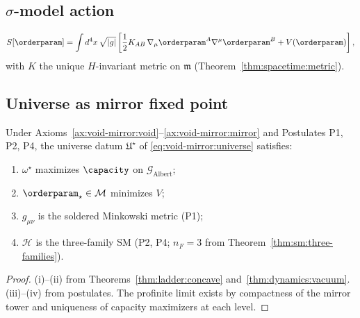 \subsection{$\sigma$-model action}
\label{sec:dynamics:action}

\begin{equation}\label{eq:dynamics:action}
  S[\orderparam]=\int d^4x\,\sqrt{|g|}\left[
    \frac{1}{2}K_{AB}\,\nabla_\mu\orderparam^A\nabla^\mu\orderparam^B
    +V(\orderparam)\right],
\end{equation}
with $K$ the unique $H$-invariant metric on $\mathfrak{m}$
(Theorem~\ref{thm:spacetime:metric}).

\subsection{Universe as mirror fixed point}
\label{sec:dynamics:universe}

\begin{theorem}\label{thm:dynamics:universe}
Under Axioms~\ref{ax:void-mirror:void}--\ref{ax:void-mirror:mirror} and
Postulates P1, P2, P4, the universe datum $\mathfrak{U}^\star$ of
\eqref{eq:void-mirror:universe} satisfies:
\begin{enumerate}[label=(\roman*)]
  \item $\omega^\star$ maximizes $\capacity$ on $\mathcal{G}_{\mathrm{Albert}}$;
  \item $\orderparam_\star\in\mathcal{M}$ minimizes $V$;
  \item $g_{\mu\nu}$ is the soldered Minkowski metric (P1);
  \item $\mathcal{H}$ is the three-family SM (P2, P4;
    $n_F=3$ from Theorem~\ref{thm:sm:three-families}).
\end{enumerate}
\end{theorem}

\begin{proof}
(i)--(ii) from Theorems~\ref{thm:ladder:concave} and~\ref{thm:dynamics:vacuum}.
(iii)--(iv) from postulates. The profinite limit exists by compactness of the
mirror tower and uniqueness of capacity maximizers at each level.
\end{proof}